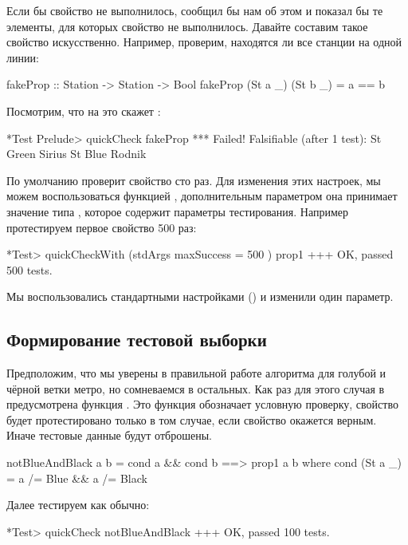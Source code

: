 Если бы свойство не выполнилось,  сообщил бы нам об этом
и показал бы те элементы, для которых свойство не выполнилось. Давайте
составим такое свойство искусственно. Например, проверим, находятся ли
все станции на одной линии:


\begin{code}
fakeProp :: Station -> Station -> Bool
fakeProp (St a _) (St b _) = a == b
\end{code}

Посмотрим, что на это скажет :


\begin{code}
*Test Prelude> quickCheck fakeProp
*** Failed! Falsifiable (after 1 test):  
St Green Sirius
St Blue Rodnik
\end{code}

По умолчанию  проверит свойство сто раз. Для изменения
этих настроек, мы можем воспользоваться функцией ,
дополнительным параметром она принимает значение типа , которое
содержит параметры тестирования. Например протестируем первое свойство
500 раз:


\begin{code}
*Test> quickCheckWith (stdArgs{ maxSuccess = 500 }) prop1
+++ OK, passed 500 tests.
\end{code}

Мы воспользовались стандартными настройками () и изменили
один параметр.

\subsection{Формирование тестовой выборки}

Предположим, что мы уверены в правильной работе алгоритма для голубой и
чёрной ветки метро, но сомневаемся в остальных. Как раз для этого случая
в  предусмотрена функция . Это функция
обозначает условную проверку, свойство  будет протестировано
только в том случае, если свойство  окажется верным. Иначе
тестовые данные будут отброшены.


\begin{code}
notBlueAndBlack a b = cond a && cond b ==> prop1 a b 
    where cond (St a _) = a /= Blue && a /= Black
\end{code}

Далее тестируем как обычно:


\begin{code}
*Test> quickCheck notBlueAndBlack 
+++ OK, passed 100 tests.
\end{code}

